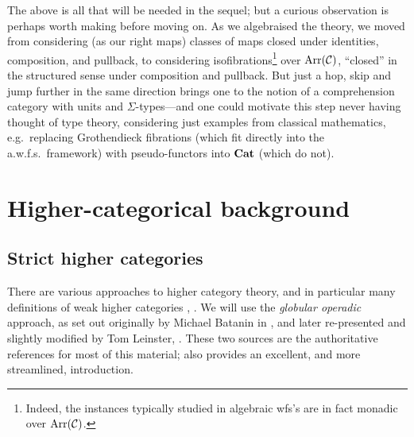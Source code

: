 \begin{para}
The above is all that will be needed in the sequel; but a curious observation is perhaps worth making before moving on.  As we algebraised the theory, we moved from considering (as our right maps) classes of maps closed under identities, composition, and pullback, to considering isofibrations\footnote{Indeed, the instances typically studied in algebraic wfs's are in fact monadic over $\mathrm{Arr}(\mathcal{C})$.} over $\mathrm{Arr}(\mathcal{C})$, ``closed'' in the structured sense under composition and pullback.  But just a hop, skip and jump further in the same direction brings one to the notion of a comprehension category with units and $\Sigma$-types---and one could motivate this step never having thought of type theory, considering just examples from classical mathematics, e.g.\ replacing Grothendieck fibrations (which fit directly into the a.w.f.s.\ framework) with pseudo-functors into $\mathbf{Cat}$ (which do not).
\end{para}

\section{Higher-categorical background}

\subsection*{Strict higher categories}

There are various approaches to higher category theory, and in particular many definitions of weak higher categories \cite{leinster:survey}, \cite{cheng-lauda:guidebook}.  We will use the \emph{globular operadic} approach, as set out originally by Michael Batanin in \cite{batanin:natural-environment}, and later re-presented and slightly modified by Tom Leinster, \cite{leinster:book}.  These two sources are the authoritative references for most of this material; \cite{leinster:survey} also provides an excellent, and more streamlined, introduction.


